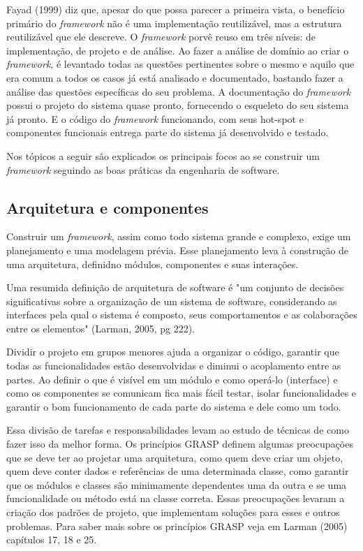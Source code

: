 Fayad (1999) diz que, apesar do que possa parecer a primeira vista, o benefício primário do \textit{framework} não é uma implementação reutilizável, mas a estrutura reutilizável que ele descreve. O \textit{framework} porvê reuso em três níveis: de implementação, de projeto e de análise. Ao fazer a análise de domínio ao criar o \textit{framework}, é levantado todas as questões pertinentes sobre o mesmo e aquilo que era comum a todos os casos já está analisado e documentado, bastando fazer a análise das questões específicas do seu problema. A documentação do \textit{framework} possui o projeto do sistema quase pronto, fornecendo o esqueleto do seu sistema já pronto. E o código do \textit{framework} funcionando, com seus hot-spot e componentes funcionais entrega parte do sistema já desenvolvido e testado.

Nos tópicos a seguir são explicados os principais focos ao se construir um \textit{framework} seguindo as boas práticas da engenharia de software.

\subsection{Arquitetura e componentes}

Construir um \textit{framework}, assim como todo sistema grande e complexo, exige um planejamento e uma modelagem prévia. Esse planejamento leva à construção de uma arquitetura, definidno módulos, componentes e suas interações.

Uma resumida definição de arquitetura de software é "um conjunto de decisões significativas sobre a organização de um sistema de software, considerando as interfaces pela qual o sistema é composto, seus comportamentos e as colaborações entre os elementos" (Larman, 2005, pg 222).

Dividir o projeto em grupos menores ajuda a organizar o código, garantir que todas as funcionalidades estão desenvolvidas e diminui o acoplamento entre as partes. Ao definir o que é visível em um módulo e como operá-lo (interface) e como os componentes se comunicam fica mais fácil testar, isolar funcionalidades e garantir o bom funcionamento de cada parte do sistema e dele como um todo.

Essa divisão de tarefas e responsabilidades levam ao estudo de técnicas de como fazer isso da melhor forma. Os princípios GRASP definem algumas preocupações que se deve ter ao projetar uma arquitetura, como quem deve criar um objeto, quem deve conter dados e referências de uma determinada classe, como garantir que os módulos e classes são minimamente dependentes uma da outra e se uma funcionalidade ou método está na classe correta. Essas preocupações levaram a criação dos padrões de projeto, que implementam soluções para esses e outros problemas. Para saber mais sobre os princípios GRASP veja em Larman (2005) capítulos 17, 18 e 25.

